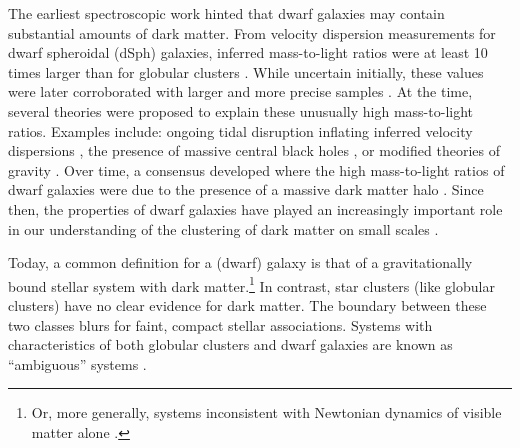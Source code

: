 The earliest spectroscopic work hinted that dwarf galaxies may contain
substantial amounts of dark matter. From velocity dispersion
measurements for dwarf spheroidal (dSph) galaxies, inferred
mass-to-light ratios were at least 10 times larger than for globular
clusters \citep[e.g.,][]{aaronson1983, aaronson+olszewski1987}. While
uncertain initially, these values were later corroborated with larger
and more precise samples \citep[e.g.,][]{hargreaves+1994}. At the time,
several theories were proposed to explain these unusually high
mass-to-light ratios. Examples include: ongoing tidal disruption
inflating inferred velocity dispersions
\citep[e.g.,][]{kuhn+miller1989}, the presence of massive central black
holes \citep[e.g.,][]{strobel+lake1994}, or modified theories of gravity
\citep{milgrom1995}. Over time, a consensus developed where the high
mass-to-light ratios of dwarf galaxies were due to the presence of a
massive dark matter halo
\citep[e.g.,][]{dekel+silk1986, wechsler+tinker2018}. Since then, the
properties of dwarf galaxies have played an increasingly important role
in our understanding of the clustering of dark matter on small scales
\citep[e.g.,][]{bullock+boylan-kolchin2017, sales+2022}.

Today, a common definition for a (dwarf) galaxy is that of a
gravitationally bound stellar system with dark matter.\footnote{Or, more
  generally, systems inconsistent with Newtonian dynamics of visible
  matter alone \citep{willman+strader2012}.} In contrast, star clusters
(like globular clusters) have no clear evidence for dark matter. The
boundary between these two classes blurs for faint, compact stellar
associations. Systems with characteristics of both globular clusters and
dwarf galaxies are known as ``ambiguous'' systems
\citep[e.g.,][]{smith+2024}.

